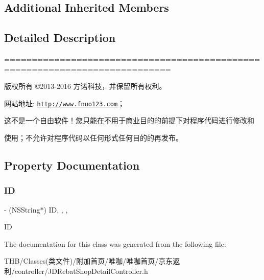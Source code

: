 \subsection*{Additional Inherited Members}


\subsection{Detailed Description}
============================================================================

版权所有 ©2013-\/2016 方诺科技，并保留所有权利。

网站地址\+: \href{http://www.fnuo123.com}{\tt http\+://www.\+fnuo123.\+com}； 



这不是一个自由软件！您只能在不用于商业目的的前提下对程序代码进行修改和

使用；不允许对程序代码以任何形式任何目的的再发布。 

 

\subsection{Property Documentation}
\mbox{\label{interface_j_d_rebat_shop_detail_controller_aef7a53b442782726e7f876091fa7d06b}} 
\subsubsection{\texorpdfstring{ID}{ID}}
{\footnotesize\ttfamily -\/ (N\+S\+String$\ast$) ID\hspace{0.3cm}{\ttfamily [read]}, {\ttfamily [write]}, {\ttfamily [nonatomic]}, {\ttfamily [copy]}}

ID 

The documentation for this class was generated from the following file\+:\begin{DoxyCompactItemize}
\item 
T\+H\+B/\+Classes(类文件)/附加首页/唯咖/唯咖首页/京东返利/controller/J\+D\+Rebat\+Shop\+Detail\+Controller.\+h\end{DoxyCompactItemize}
